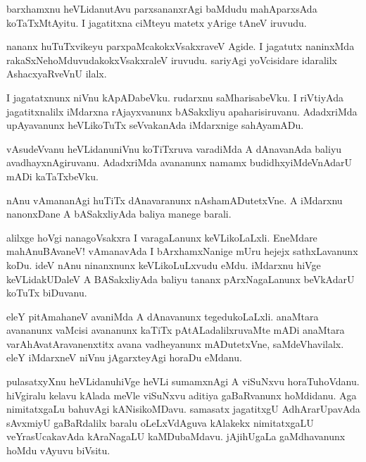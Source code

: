 \begin{mng}
barxhamxnu heVLidanu\mdash tAvu parxsananxrAgi baMdudu mahAparxsAda koTaTxMtAyitu. I jagatitxna ciMteyu matetx yArige tAneV iruvudu.
\end{mng}

\begin{mng}
nananx huTuTxvikeyu parxpaMcakokxVsakxraveV Agide. I jagatutx naninxMda rakaSxNehoMduvudakokxVsakxraleV iruvudu. sariyAgi yoVcisidare idaralilx AshacxyaRveVnU ilalx.
\end{mng}

\begin{mng}
I jagatatxnunx niVnu kApADabeVku. rudarxnu saMharisabeVku. I riVtiyAda jagatitxnalilx iMdarxna rAjayxvanunx bASakxliyu apaharisiruvanu. AdadxriMda upAyavanunx heVLikoTuTx seVvakanAda iMdarxnige sahAyamADu.
\end{mng}

\begin{mng}
vAsudeVvanu heVLidanu\mdash niVnu koTiTxruva varadiMda A dAnavanAda baliyu avadhayxnAgiruvanu. AdadxriMda avananunx namamx budidhxyiMdeVnAdarU mADi kaTaTxbeVku.
\end{mng}

\begin{mng}
nAnu vAmananAgi huTiTx dAnavaranunx nAshamADutetxVne. A iMdarxnu nanonxDane A bASakxliyAda baliya manege barali.
\end{mng}

\begin{mng}
alilxge hoVgi nanagoVsakxra I varagaLanunx keVLikoLaLxli. EneMdare mahAnuBAvaneV! vAmanavAda I bArxhamxNanige mUru hejejx sathxLavanunx koDu. ideV nAnu ninanxnunx keVLikoLuLxvudu eMdu. iMdarxnu hiVge keVLidakUDaleV A BASakxliyAda baliyu tananx pArxNagaLanunx beVkAdarU koTuTx biDuvanu.
\end{mng}

\begin{mng}
eleY pitAmahaneV avaniMda A dAnavanunx tegedukoLaLxli. anaMtara avananunx vaMcisi avananunx kaTiTx pAtALadalilxruvaMte mADi anaMtara varAhAvatAravanenxtitx avana vadheyanunx mADutetxVne, saMdeVhavilalx. eleY iMdarxneV niVnu jAgarxteyAgi horaDu eMdanu.
\end{mng}

\begin{mng}
pulasatxyXnu heVLidanu\mdash hiVge heVLi sumamxnAgi A viSuNxvu horaTuhoVdanu. hiVgiralu kelavu kAlada meVle viSuNxvu aditiya gaBaRvanunx hoMdidanu. Aga nimitatxgaLu bahuvAgi kANisikoMDavu. samasatx jagatitxgU AdhArarUpavAda sAvxmiyU gaBaRdalilx baralu oLeLxVdAguva kAlakekx nimitatxgaLU veYrasUcakavAda kAraNagaLU kaMDubaMdavu. jAjihUgaLa gaMdhavanunx hoMdu vAyuvu biVsitu.
\end{mng}

